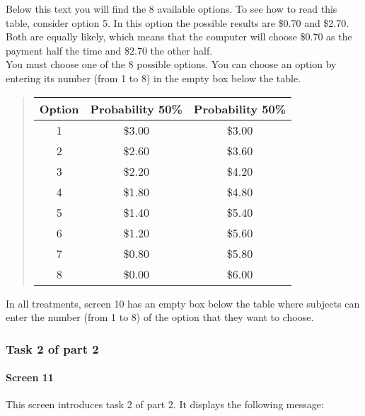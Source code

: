 \documentclass[11pt]{article}
\begin{document}
\begin{tcolorbox}
Below this text you will find the 8 available options. To see how to read this table, consider option 5. In this option the possible results are \$0.70 and \$2.70. Both are equally likely, which means that the computer will choose \$0.70 as the payment half the time and \$2.70 the other half.\\

You must choose one of the 8 possible options. You can choose an option by entering its number (from 1 to 8) in the empty box below the table.

\begin{quote}
\begin{center}
	\begin{tabular}{c|c|c|}
		Option & Probability 50\% & Probability 50\% \\
		\hline 1 & \$3.00 & \$3.00 \\
		\hline 2 & \$2.60 & \$3.60 \\
		\hline 3 & \$2.20 & \$4.20 \\
		\hline 4 & \$1.80 & \$4.80 \\
		\hline 5 & \$1.40 & \$5.40 \\
		\hline 6 & \$1.20 & \$5.60 \\
		\hline 7 & \$0.80 & \$5.80 \\
		\hline 8 & \$0.00 & \$6.00 \\
		\hline
	\end{tabular}
\end{center}
\end{quote}
\end{tcolorbox}

In all treatments, screen 10 has an empty box below the table where subjects can enter the number (from 1 to 8) of the option that they want to choose.

\subsubsection{Task 2 of part 2}

\paragraph{Screen 11} This screen introduces task 2 of part 2. It displays the following message:
\end{document}
